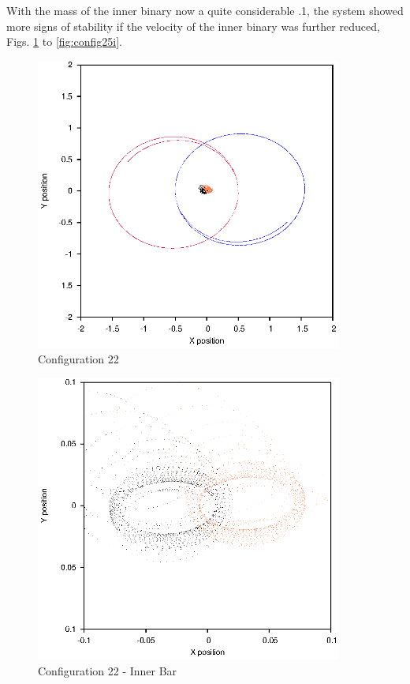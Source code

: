 \documentclass[a4paper,12pt]{article}
\begin{document}
With the mass of the inner binary now a quite considerable .1, the system showed more signs of stability if the velocity of the inner binary was further reduced, Figs. \ref{fig:config22} to \ref{fig:config25i}.
\begin{figure}[H]
\centering
\includegraphics[width=0.9\textwidth]{./2017results/1-1-1-05/Orbit.eps}
\caption{Configuration 22}
\label{fig:config22}
\end{figure}
\begin{figure}[H]
\centering
\includegraphics[width=0.9\textwidth]{./2017results/1-1-1-05/Inner.eps}
\caption{Configuration 22 - Inner Bar}
\label{fig:config22i}
\end{figure}
\end{document}
